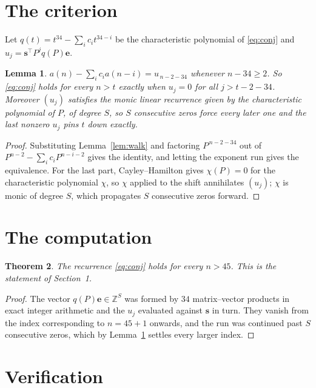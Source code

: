 \documentclass[11pt,a4paper]{article}
\theoremstyle{plain}
\newtheorem{theorem}{Theorem}
\newtheorem{lemma}[theorem]{Lemma}
\theoremstyle{definition}
\begin{document}
\section{The criterion}

Let $q(t)=t^{34}-\sum_i c_i t^{34-i}$ be the characteristic polynomial of
\eqref{eq:conj} and $u_j=\mathbf{s}^{\!\top}P^{j}q(P)\mathbf{e}$.

\begin{lemma}\label{lem:crit}
$a(n)-\sum_i c_i a(n-i)=u_{\,n-2-34}$ whenever $n-34\ge2$. So \eqref{eq:conj}
holds for every $n>t$ exactly when $u_j=0$ for all $j>t-2-34$. Moreover $(u_j)$
satisfies the monic linear recurrence given by the characteristic polynomial of $P$, of
degree $S$, so $S$ consecutive zeros force every later one and the last nonzero $u_j$ pins
$t$ down exactly.
\end{lemma}

\begin{proof}
Substituting Lemma~\ref{lem:walk} and factoring $P^{\,n-2-34}$ out of
$P^{n-2}-\sum_i c_i P^{n-i-2}$ gives the identity, and letting the exponent run gives the
equivalence. For the last part, Cayley--Hamilton gives $\chi(P)=0$ for the characteristic
polynomial $\chi$, so $\chi$ applied to the shift annihilates $(u_j)$; $\chi$ is monic of
degree $S$, which propagates $S$ consecutive zeros forward.
\end{proof}

\section{The computation}

\begin{theorem}
The recurrence \eqref{eq:conj} holds for every $n>45$. This is the statement of
Section~1.
\end{theorem}

\begin{proof}
The vector $q(P)\mathbf{e}\in\mathbb{Z}^{S}$ was formed by $34$ matrix--vector
products in exact integer arithmetic and the $u_j$ evaluated against $\mathbf{s}$ in turn.
They vanish from the index corresponding to $n=45+1$ onwards, and the run was continued
past $S$ consecutive zeros, which by Lemma~\ref{lem:crit} settles every larger index.
\end{proof}

\section{Verification}
\end{document}
